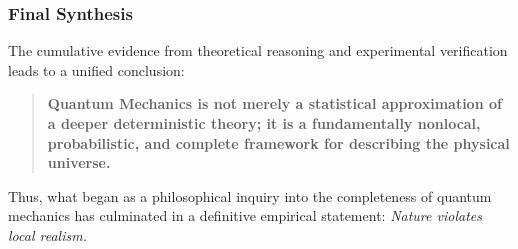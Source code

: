 \subsubsection{Final Synthesis}

The cumulative evidence from theoretical reasoning and experimental verification leads to a unified conclusion:
\begin{quote}
\textbf{Quantum Mechanics is not merely a statistical approximation of a deeper deterministic theory; it is a fundamentally nonlocal, probabilistic, and complete framework for describing the physical universe.}
\end{quote}

Thus, what began as a philosophical inquiry into the completeness of quantum mechanics has culminated in a definitive empirical statement:  
\textit{Nature violates local realism.}

